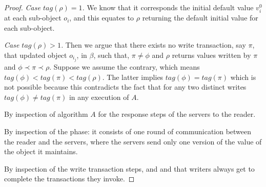 {\begin{proof}
	\emph{Case $tag(\rho) = 1$.} We  know that it corresponds the initial default value $v_i^0$ at each sub-object $o_i$, and this equates to $\rho$ returning the default initial value for each sub-object.
	 
	 \emph{Case $tag(\rho) > 1$.} Then we argue that there exists no {\sc write} transaction, say $\pi$, that updated object $o_{i_j}$,   in $\beta$, such that,  $\pi \neq \phi$ and $\rho$ returns values written by $\pi$ and $\phi \prec \pi \prec \rho$. Suppose we assume the 	contrary, which means $tag(\phi) < tag(\pi) < tag(\rho)$. The latter implies $tag(\phi)  = tag(\pi)$ which is not possible because 
	this contradicts the fact that for any two distinct {\sc write}s $tag(\phi) \neq tag(\pi)$  in any execution of   $A$.
	
	  By inspection of algorithm $A$ for the  response steps  of the servers to the reader.
	
	 By inspection of the  {\readValue} phase: it consists of one round of communication between the reader and the servers, where the servers send only one version of the value of the object it maintains.
	
	  By inspection of the {\sc write} transaction steps, and  and  that writers always get to complete the transactions they invoke.
	\end{proof}
}
